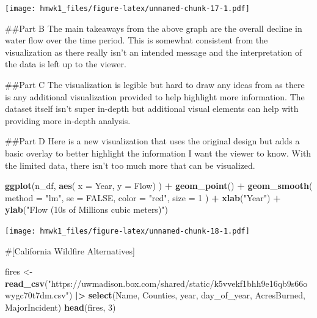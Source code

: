 \documentclass[
]{article}
\newenvironment{Shaded}{\begin{snugshade}}{\end{snugshade}}
\newcommand{\AttributeTok}[1]{\textcolor[rgb]{0.13,0.29,0.53}{#1}}
\newcommand{\ConstantTok}[1]{\textcolor[rgb]{0.56,0.35,0.01}{#1}}
\newcommand{\DecValTok}[1]{\textcolor[rgb]{0.00,0.00,0.81}{#1}}
\newcommand{\FunctionTok}[1]{\textcolor[rgb]{0.13,0.29,0.53}{\textbf{#1}}}
\newcommand{\NormalTok}[1]{#1}
\newcommand{\OtherTok}[1]{\textcolor[rgb]{0.56,0.35,0.01}{#1}}
\newcommand{\SpecialCharTok}[1]{\textcolor[rgb]{0.81,0.36,0.00}{\textbf{#1}}}
\newcommand{\StringTok}[1]{\textcolor[rgb]{0.31,0.60,0.02}{#1}}
\begin{document}
\texttt{[image: hmwk1\_files/figure-latex/unnamed-chunk-17-1.pdf]}

\#\#Part B The main takeaways from the above graph are the overall
decline in water flow over the time period. This is somewhat consistent
from the visualization as there really isn't an intended message and the
interpretation of the data is left up to the viewer.

\#\#Part C The visualization is legible but hard to draw any ideas from
as there is any additional visualization provided to help highlight more
information. The dataset itself isn't super in-depth but additional
visual elements can help with providing more in-depth analysis.

\#\#Part D Here is a new visualization that uses the original design but
adds a basic overlay to better highlight the information I want the
viewer to know. With the limited data, there isn't too much more that
can be visualized.

\begin{Shaded}
\begin{Highlighting}[]
\FunctionTok{ggplot}\NormalTok{(n\_df, }
       \FunctionTok{aes}\NormalTok{(}
         \AttributeTok{x =}\NormalTok{ Year, }
         \AttributeTok{y =}\NormalTok{ Flow)}
\NormalTok{       ) }\SpecialCharTok{+}
  \FunctionTok{geom\_point}\NormalTok{() }\SpecialCharTok{+}
  \FunctionTok{geom\_smooth}\NormalTok{(}
    \AttributeTok{method =} \StringTok{"lm"}\NormalTok{, }
    \AttributeTok{se =} \ConstantTok{FALSE}\NormalTok{, }
    \AttributeTok{color =} \StringTok{"red"}\NormalTok{, }
    \AttributeTok{size =} \DecValTok{1}
\NormalTok{    ) }\SpecialCharTok{+}
  \FunctionTok{xlab}\NormalTok{(}\StringTok{"Year"}\NormalTok{) }\SpecialCharTok{+}
  \FunctionTok{ylab}\NormalTok{(}\StringTok{"Flow (10\textquotesingle{}s of Millions cubic meters)"}\NormalTok{)}
\end{Highlighting}
\end{Shaded}

\texttt{[image: hmwk1\_files/figure-latex/unnamed-chunk-18-1.pdf]}

\#{[}California Wildfire Alternatives{]}

\begin{Shaded}
\begin{Highlighting}[]
\NormalTok{fires }\OtherTok{\textless{}{-}} \FunctionTok{read\_csv}\NormalTok{(}\StringTok{"https://uwmadison.box.com/shared/static/k5vvekf1bhh9e16qb9s66owygc70t7dm.csv"}\NormalTok{) }\SpecialCharTok{|\textgreater{}}
  \FunctionTok{select}\NormalTok{(Name, Counties, year, day\_of\_year, AcresBurned, MajorIncident)}
\FunctionTok{head}\NormalTok{(fires, }\DecValTok{3}\NormalTok{)}
\end{Highlighting}
\end{Shaded}
\end{document}
